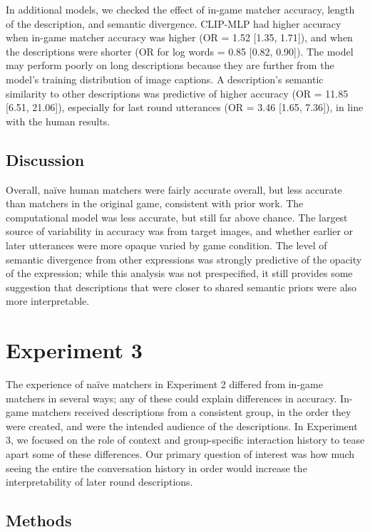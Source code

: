 \documentclass[10pt, letterpaper]{article}
\begin{document}
In additional models, we checked the effect of in-game matcher accuracy,
length of the description, and semantic divergence. CLIP-MLP had higher
accuracy when in-game matcher accuracy was higher (OR = 1.52 {[}1.35,
1.71{]}), and when the descriptions were shorter (OR for log words =
0.85 {[}0.82, 0.90{]}). The model may perform poorly on long
descriptions because they are further from the model's training
distribution of image captions. A description's semantic similarity to
other descriptions was predictive of higher accuracy (OR = 11.85
{[}6.51, 21.06{]}), especially for last round utterances (OR = 3.46
{[}1.65, 7.36{]}), in line with the human results.

\subsection{Discussion}\label{discussion}

Overall, naïve human matchers were fairly accurate overall, but less
accurate than matchers in the original game, consistent with prior work.
The computational model was less accurate, but still far above chance.
The largest source of variability in accuracy was from target images,
and whether earlier or later utterances were more opaque varied by game
condition. The level of semantic divergence from other expressions was
strongly predictive of the opacity of the expression; while this
analysis was not prespecified, it still provides some suggestion that
descriptions that were closer to shared semantic priors were also more
interpretable.

\section{Experiment 3}\label{experiment-3}

The experience of naïve matchers in Experiment 2 differed from in-game
matchers in several ways; any of these could explain differences in
accuracy. In-game matchers received descriptions from a consistent
group, in the order they were created, and were the intended audience of
the descriptions. In Experiment 3, we focused on the role of context and
group-specific interaction history to tease apart some of these
differences. Our primary question of interest was how much seeing the
entire the conversation history in order would increase the
interpretability of later round descriptions.

\subsection{Methods}\label{methods-2}
\end{document}
